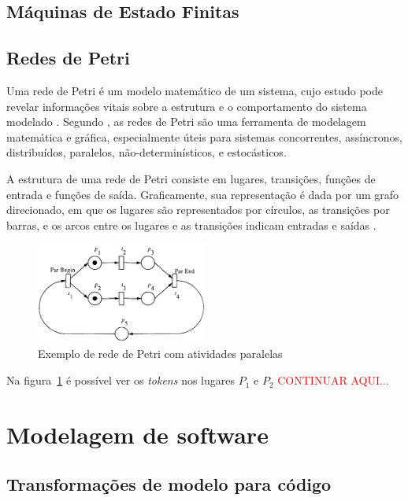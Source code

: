 \subsection{Máquinas de Estado Finitas}
\subsection{Redes de Petri}
Uma rede de Petri é um modelo matemático de um sistema, cujo estudo pode revelar informações vitais sobre a estrutura e o comportamento do sistema modelado \cite{peterson:1981}. Segundo , as redes de Petri são uma ferramenta de modelagem matemática e gráfica, especialmente úteis para sistemas concorrentes, assíncronos, distribuídos, paralelos, não-determinísticos, e estocásticos.

A estrutura de uma rede de Petri consiste em lugares, transições, funções de entrada e funções de saída. Graficamente, sua representação é dada por um grafo direcionado, em que os lugares são representados por círculos, as transições por barras, e os arcos entre os lugares e as transições indicam entradas e saídas \cite{peterson:1981}. %

\begin{figure}[h]
	\caption{\label{fig:petrinet}Exemplo de rede de Petri com atividades paralelas}
	\begin{center}
	    \includegraphics[width=0.5\textwidth]{resources/petri_net_murata_1}
	\end{center}
\end{figure}
Na figura~\ref{fig:petrinet} é possível ver os \textit{tokens} nos lugares $P_1$ e $P_2$ \textcolor{red}{CONTINUAR AQUI...}

\section{Modelagem de software}
\label{sec:modelagem}
\subsection{Transformações de modelo para código}